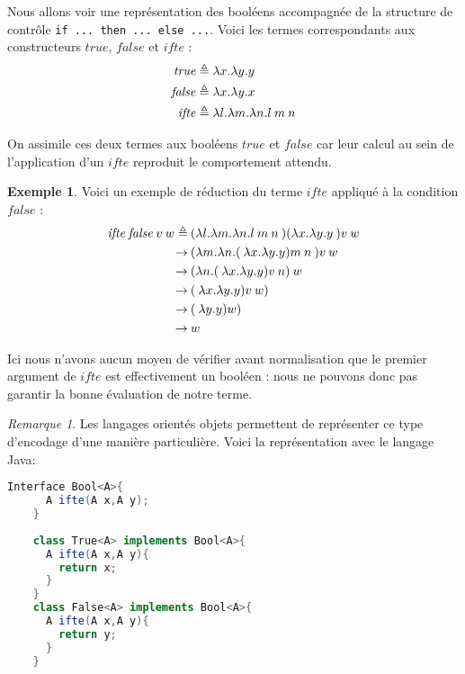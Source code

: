 \documentclass {article}
\theoremstyle{definition}
\newtheorem{example}{Exemple}
\theoremstyle{remark}
\newtheorem{remark}{Remarque}
\begin{document}
\newcommand{\True}{\ensuremath{\mathit{true}}}
\newcommand{\False}{\ensuremath{\mathit{false}}}
\newcommand{\Ifte}{\ensuremath{\mathit{ifte}}}

Nous allons voir une représentation des booléens accompagnée de la 
structure de contrôle \texttt{if ... then ... else ...}.
Voici les termes correspondants aux constructeurs \True{}, \False{} et 
\Ifte{} :
\begin{align*}
  \True &\triangleq  \Lam{x}{\Lam{y}{\Var{y}}} \\
  \False &\triangleq \Lam{x}{\Lam{y}{\Var{x}}} \\
  \Ifte &\triangleq \Lam{l}{\Lam{m}{\Lam{n}{\App{\Var{l}}{\App{\Var{m}}{\Var{n}}}}}}  \\
\end{align*}

On assimile ces deux termes aux booléens \True{} et \False{} car leur calcul au sein
de l'application d'un \Ifte{} reproduit le comportement attendu.

\begin{example}
  Voici un exemple de réduction du terme \Ifte{} appliqué à la condition \False{} :
  \begin{align*}
    \App{\App{\App{\Ifte}{\False{}}}{\Var{v}}}{\Var{w}}  \triangleq&\: \App{\App{\App{(\Lam{l}{\Lam{m}{\Lam{n}{\App{\App{l}{m}}{n}}}}})({\Lam{x}{\Lam{y}{y}}}}){v}}{w} \\
    \rightarrow &\: \App{\App{({\Lam{m}{\Lam{n}{\App{\App({\Lam{x}{\Lam{y}{y}}}){m}}{n}}}}}){v}}{w} \\
    \rightarrow &\: \App{(\Lam{n}{\App{\App({\Lam{x}{\Lam{y}{y}}}){v}}{n}})}{w} \\
    \rightarrow &\: \App{\App({\Lam{x}{\Lam{y}{y}}}){v}}{w}) \\
    \rightarrow &\: \App({\Lam{y}{y}}){w}) \\
    \rightarrow &\: \Var{w}
  \end{align*}
\end{example}

Ici nous n'avons aucun moyen de vérifier avant normalisation que le
premier argument de \Ifte{} est effectivement un booléen : nous ne
pouvons donc pas garantir la bonne évaluation de notre terme.

\begin{remark}
  Les langages orientés objets permettent de représenter ce type d'encodage d'une manière particulière.
  Voici la représentation avec le langage Java:
  \begin{lstlisting}[language=java]
    Interface Bool<A>{
      A ifte(A x,A y);
    }
    
    class True<A> implements Bool<A>{
      A ifte(A x,A y){
        return x;
      }
    }
    class False<A> implements Bool<A>{
      A ifte(A x,A y){
        return y;
      }
    }    
  \end{lstlisting}
\end{remark}
\end{document}
